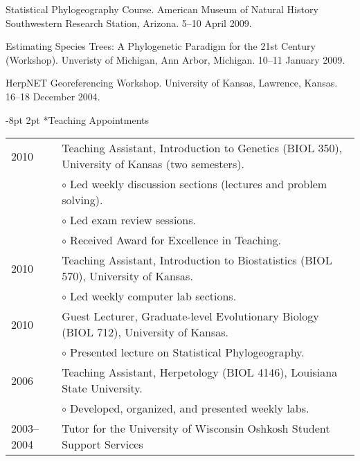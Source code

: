 \documentclass[10pt]{article}
\makeatletter
\renewcommand{\section}{\@startsection{section}{1}{0mm}%
    {-8pt}%
    {2pt}%
   {\bfseries\large}}
\makeatother
\begin{document}
\hangindent=5mm
Statistical Phylogeography Course.
American Museum of Natural History Southwestern Research Station, Arizona.
5--10 April 2009.

\hangindent=5mm
Estimating Species Trees: A Phylogenetic Paradigm for the 21st Century (Workshop).
Unveristy of Michigan, Ann Arbor, Michigan.
10--11 January 2009.

\hangindent=5mm
HerpNET Georeferencing Workshop.
University of Kansas, Lawrence, Kansas.
16--18 December 2004.

\section*{Teaching Appointments}
\noindent\begin{tabulary}{\textwidth}{ @{} l L @{} }
2010		& Teaching Assistant, Introduction to Genetics (BIOL 350), University of Kansas (two semesters). \\
		& \addtolength{\leftskip}{4mm} $\circ$ Led weekly discussion sections (lectures and problem solving). \\
		& \addtolength{\leftskip}{4mm} $\circ$ Led exam review sessions. \\
		& \addtolength{\leftskip}{4mm} $\circ$ Received Award for Excellence in Teaching. \\
2010		& Teaching Assistant, Introduction to Biostatistics (BIOL 570), University of Kansas. \\
		& \addtolength{\leftskip}{4mm} $\circ$ Led weekly computer lab sections. \\
2010		& Guest Lecturer, Graduate-level Evolutionary Biology (BIOL 712), University of Kansas. \\
		& \addtolength{\leftskip}{4mm} $\circ$ Presented lecture on Statistical Phylogeography. \\
2006		& Teaching Assistant, Herpetology (BIOL 4146), Louisiana State University. \\
		& \addtolength{\leftskip}{4mm} $\circ$ Developed, organized, and presented weekly labs. \\
2003--2004	& Tutor for the University of Wisconsin Oshkosh Student Support Services \\
\end{tabulary}
\end{document}
